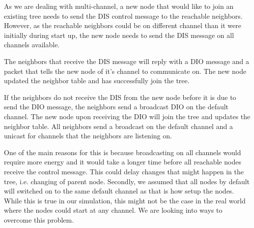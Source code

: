 As we are dealing with multi-channel, a new node that would like to join an existing tree needs to send the DIS control message to the reachable neighbors. However, as the reachable neighbors could be on different channel than it were initially during start up, the new node needs to send the DIS message on all channels available. 

The neighbors that receive the DIS message will reply with a DIO message and a packet that tells the new node of it's channel to communicate on. The new node updated the neighbor table and has successfully join the tree. 

If the neighbors do not receive the DIS from the new node before it is due to send the DIO message, the neighbors send a broadcast DIO on the default channel. The new node upon receiving the DIO will join the tree and updates the neighbor table. All neighbors send a broadcast on the default channel and a unicast for channels that the neighbors are listening on. 

One of the main reasons for this is because broadcasting on all channels would require more energy and it would take a longer time before all reachable nodes receive the control message. This could delay changes that might happen in the tree, i.e. changing of parent node. Secondly, we assumed that all nodes by default will switched on to the same default channel as that is how setup the nodes. While this is true in our simulation, this might not be the case in the real world where the nodes could start at any channel. We are looking into ways to overcome this problem.

